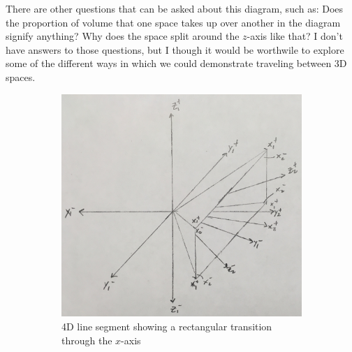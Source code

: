 \documentclass[20pt]{article} %
\begin{document}
\newpage
There are other questions that can be asked about this diagram, such as: Does the proportion of volume that one space takes up over another in the diagram signify anything? Why does the space split around the $z$-axis like that? I don't have answers to those questions, but I though it would be worthwile to explore some of the different ways in which we could demonstrate traveling between 3D spaces.

\begin{figure}[!htbp]
  	\centering
   	\begin{subfigure}[!p]{0.5\linewidth}
	\centering
    	\includegraphics[width=\linewidth]{./figures/fig5.jpg}
	\caption{4D line segment showing a rectangular transition through the $x$-axis}
	\label{fig:sub1}
   	\end{subfigure}
  	\centering
   	\begin{subfigure}[!p]{0.448\linewidth}
	\centering

\end{subfigure}
\end{figure}
\end{document}
